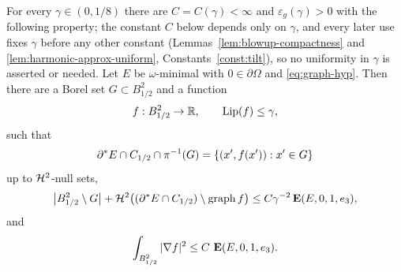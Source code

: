 \begin{theorem}\label{thm:graph-approx}
For every $\gamma\in(0,1/8)$ there are $C=C(\gamma)<\infty$ and
$\varepsilon_g(\gamma)>0$ with the following property; the constant $C$ below
depends only on $\gamma$, and every later use fixes $\gamma$ before any other
constant (Lemmas~\ref{lem:blowup-compactness} and
\ref{lem:harmonic-approx-uniform}, Constants~\ref{const:tilt}), so no
uniformity in $\gamma$ is asserted or needed.  Let $E$ be $\omega$-minimal
with $0\in\partial\Omega$ and \eqref{eq:graph-hyp}.  Then there are a Borel set $G\subset B^2_{1/2}$ and a
function
\begin{equation}\label{eq:graph-lipschitz}
  f:B^2_{1/2}\to\mathbb R,\qquad\operatorname{Lip}(f)\le\gamma ,
\end{equation}
such that
\begin{equation}\label{eq:graph-identity}
  \partial^* E\cap C_{1/2}\cap\pi^{-1}(G)
  =\{(x',f(x')):x'\in G\}
\end{equation}
up to $\mathcal H^2$-null sets,
\begin{equation}\label{eq:graph-loss}
  \bigl|B^2_{1/2}\setminus G\bigr|
  +\mathcal H^2\bigl((\partial^* E\cap C_{1/2})\setminus\operatorname{graph}f\bigr)
  \le C\gamma^{-2}\operatorname{\mathbf E}(E,0,1,e_3),
\end{equation}
and
\begin{equation}\label{eq:graph-dirichlet}
  \int_{B^2_{1/2}}|\nabla f|^2\le C\,\operatorname{\mathbf E}(E,0,1,e_3).
\end{equation}
\end{theorem}

